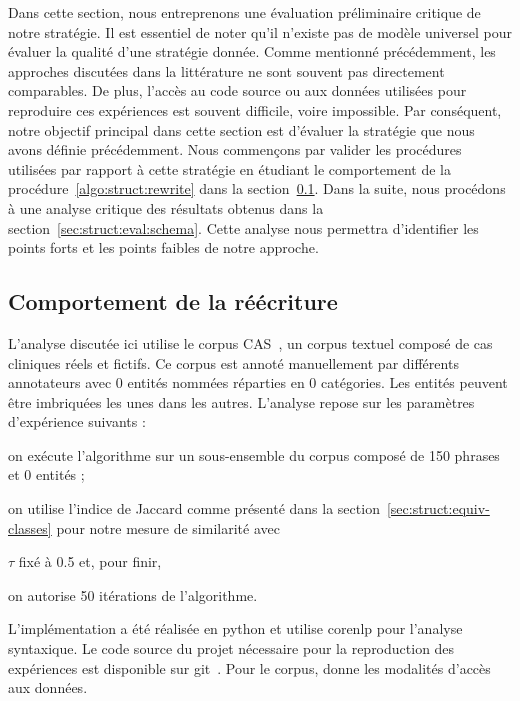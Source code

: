 Dans cette section, nous entreprenons une évaluation préliminaire critique de notre stratégie.
Il est essentiel de noter qu'il n'existe pas de modèle universel pour évaluer la qualité d'une stratégie donnée.
Comme mentionné précédemment, les approches discutées dans la littérature ne sont souvent pas directement comparables.
De plus, l'accès au code source ou aux données utilisées pour reproduire ces expériences est souvent difficile, voire impossible.
Par conséquent, notre objectif principal dans cette section est d'évaluer la stratégie que nous avons définie précédemment.
Nous commençons par valider les procédures utilisées par rapport à cette stratégie en étudiant le comportement de la procédure~\ref{algo:struct:rewrite} dans la section~\ref{sec:struct:eval:algo}.
Dans la suite, nous procédons à une analyse critique des résultats obtenus dans la section~\ref{sec:struct:eval:schema}.
Cette analyse nous permettra d'identifier les points forts et les points faibles de notre approche.

\subsection{Comportement de la réécriture}
\label{sec:struct:eval:algo}

L'analyse discutée ici utilise le corpus CAS~\cite{grabarCASFrenchCorpus2018}, un corpus textuel composé de cas cliniques réels et fictifs.
Ce corpus est annoté manuellement par différents annotateurs avec \num{0} entités nommées réparties en \num{0} catégories.
Les entités peuvent être imbriquées les unes dans les autres.
L'analyse repose sur les paramètres d'expérience suivants :
\begin{enumerate*}[label=(\roman*)]
    \item on exécute l'algorithme sur un sous-ensemble du corpus composé de \num{150} phrases et \num{0} entités ;
    \item on utilise l'indice de Jaccard comme présenté dans la section~\ref{sec:struct:equiv-classes} pour notre mesure de similarité avec
    \item $\tau$ fixé à \num{0.5} et, pour finir,
    \item on autorise \num{50} itérations de l'algorithme.
\end{enumerate*}
L'implémentation a été réalisée en \gls{python} et utilise \gls{corenlp} pour l'analyse syntaxique.
Le code source du projet nécessaire pour la reproduction des expériences est disponible sur \gls{git}~\cite{}.
Pour le corpus, \cite{grabarCASFrenchCorpus2018} donne les modalités d'accès aux données.

